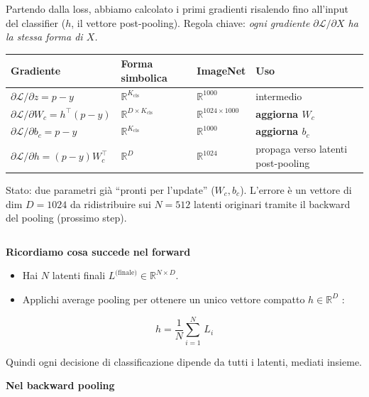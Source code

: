 \documentclass[
  11pt,
]{article}
\begin{document}
\begin{notabox}[title={\textbf{Checkpoint gradienti --- fine Loss + Softmax + Classifier}}]
Partendo dalla loss, abbiamo calcolato i primi gradienti risalendo fino all'input del classifier ($h$, il vettore post-pooling). Regola chiave: \emph{ogni gradiente $\partial\mathcal{L}/\partial X$ ha la stessa forma di $X$.}

\medskip
\begin{center}
\begin{tabular}{@{}llll@{}}
\toprule
\textbf{Gradiente} & \textbf{Forma simbolica} & \textbf{ImageNet} & \textbf{Uso} \\
\midrule
$\partial\mathcal{L}/\partial z = p - y$ & $\mathbb{R}^{K_{\text{cls}}}$ & $\mathbb{R}^{1000}$ & intermedio \\
$\partial\mathcal{L}/\partial W_c = h^\top (p - y)$ & $\mathbb{R}^{D \times K_{\text{cls}}}$ & $\mathbb{R}^{1024 \times 1000}$ & \textbf{aggiorna $W_c$} \\
$\partial\mathcal{L}/\partial b_c = p - y$ & $\mathbb{R}^{K_{\text{cls}}}$ & $\mathbb{R}^{1000}$ & \textbf{aggiorna $b_c$} \\
$\partial\mathcal{L}/\partial h = (p-y) W_c^\top$ & $\mathbb{R}^{D}$ & $\mathbb{R}^{1024}$ & propaga verso latenti post-pooling \\
\bottomrule
\end{tabular}
\end{center}

\medskip
Stato: due parametri già ``pronti per l'update'' ($W_c, b_c$). L'errore è un vettore di dim $D=1024$ da ridistribuire sui $N=512$ latenti originari tramite il backward del pooling (prossimo step).
\end{notabox}

\[\ \]

\textbf{Ricordiamo cosa succede nel forward}

\begin{itemize}
\item
  Hai \(N\) latenti finali
  \(L^{\text{(finale)}} \in \mathbb{R}^{N \times D}\).
\item
  Applichi average pooling per ottenere un unico vettore compatto
  \(h \in \mathbb{R}^{D}\) :
\end{itemize}


\[h = \frac{1}{N}\sum_{i = 1}^{N}\, L_{i}\]


Quindi ogni decisione di classificazione dipende da tutti i latenti,
mediati insieme.

\textbf{Nel backward pooling}
\end{document}
